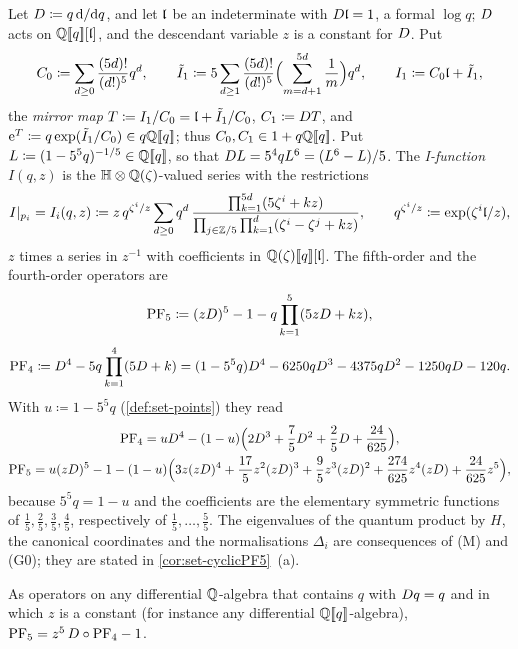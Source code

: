 \begin{defn}
\label{def:set-genus0}
Let $D\coloneqq q\,\mathrm{d}/\mathrm{d} q$, and let $\mathfrak{l}$ be an indeterminate with $D\mathfrak{l}=1$, a formal $\log q$; $D$ acts on $\mathbb{Q}[\![ q ]\!][\mathfrak{l}]$, and the descendant variable $z$ is a constant for $D$. Put
\[
C_0\coloneqq\sum_{d\geq0}\frac{(5d)!}{(d!)^5}q^d,\qquad\tilde I_1\coloneqq5\sum_{d\geq1}\frac{(5d)!}{(d!)^5}\Bigl(\sum_{m=d+1}^{5d}\frac1m\Bigr)q^d,\qquad I_1\coloneqq C_0\mathfrak{l}+\tilde I_1,
\]
the \emph{mirror map} $T\coloneqq I_1/C_0=\mathfrak{l}+\tilde I_1/C_0$, $C_1\coloneqq D T$, and $\mathrm{e}^T\coloneqq q\exp(\tilde I_1/C_0)\in q\mathbb{Q}[\![ q ]\!]$; thus $C_0,C_1\in1+q\mathbb{Q}[\![ q ]\!]$. Put $L\coloneqq(1-5^5q)^{-1/5}\in\mathbb{Q}[\![ q ]\!]$, so that $D L=5^4qL^6=(L^6-L)/5$. The \emph{I-function} $I(q,z)$ is the $\mathbb{H}\otimes\mathbb{Q}(\zeta)$-valued series with the restrictions
\[
I|_{p_i}=I_i(q,z)\coloneqq z\,q^{\zeta^i/z}\sum_{d\geq0}q^d\,\frac{\prod_{k=1}^{5d}(5\zeta^i+kz)}{\prod_{j\in\mathbb{Z}/5}\prod_{k=1}^{d}(\zeta^i-\zeta^j+kz)},\qquad q^{\zeta^i/z}\coloneqq\exp(\zeta^i\mathfrak{l}/z),
\]
$z$ times a series in $z^{-1}$ with coefficients in $\mathbb{Q}(\zeta)[\![ q ]\!][\mathfrak{l}]$. The fifth-order and the fourth-order operators are
\begin{equation}
\label{eq:set-PF5}
\mathrm{PF}_{5}\coloneqq(zD)^5-1-q\prod_{k=1}^5(5zD+kz),
\end{equation}
\begin{equation}
\label{eq:set-PF4}
\mathrm{PF}_{4}\coloneqq D^4-5q\prod_{k=1}^4(5D+k)=(1-5^5q)D^4-6250qD^3-4375qD^2-1250qD-120q .
\end{equation}
With $u\coloneqq1-5^5q$ (\cref{def:set-points}) they read
\begin{gather*}
\mathrm{PF}_{4}=uD^4-(1-u)\Bigl(2D^3+\frac75D^2+\frac25D+\frac{24}{625}\Bigr),\\
\mathrm{PF}_{5}=u(zD)^5-1-(1-u)\Bigl(3z(zD)^4+\frac{17}5z^2(zD)^3+\frac95z^3(zD)^2+\frac{274}{625}z^4(zD)+\frac{24}{625}z^5\Bigr),
\end{gather*}
because $5^5q=1-u$ and the coefficients are the elementary symmetric functions of $\frac15,\frac25,\frac35,\frac45$, respectively of $\frac15,\dots,\frac55$. The eigenvalues of the quantum product by $H$, the canonical coordinates and the normalisations $\Delta_i$ are consequences of (M) and (G0); they are stated in \cref{cor:set-cyclicPF5}~(a).
\end{defn}

\begin{lem}[$\PFfive=z^5\Dq\PFfour-1$]
\label{lem:set-pf5}
As operators on any differential $\mathbb{Q}$-algebra that contains $q$ with $D q=q$ and in which $z$ is a constant (for instance any differential $\mathbb{Q}[\![ q ]\!]$-algebra), $\mathrm{PF}_{5}=z^5\,D\circ\mathrm{PF}_{4}-1$.
\end{lem}

